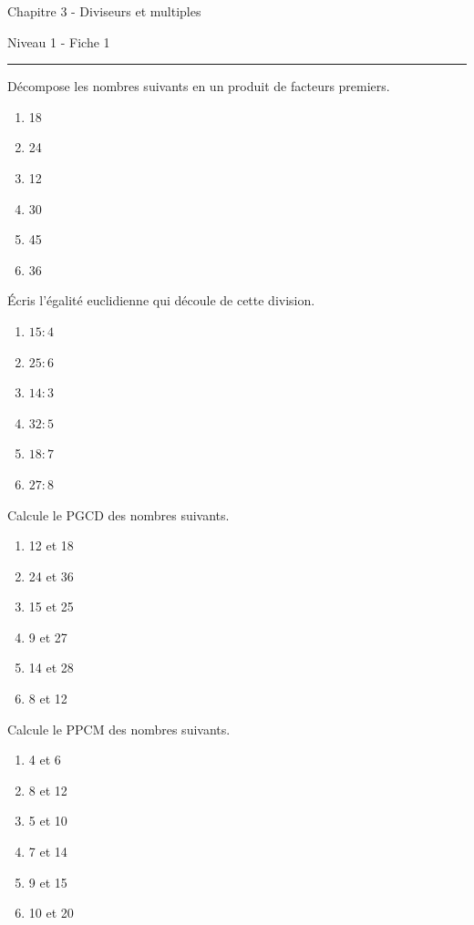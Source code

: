 \documentclass[12pt,parskip=half-, twoside=semi]{scrartcl}
\begin{document}
\begin{center}
  \bfseries
  \begin{Huge}
    Chapitre 3 - Diviseurs et multiples
  \end{Huge}
  \smallbreak
  \begin{large}
    Niveau 1  - Fiche 1
  \end{large}
  \smallbreak
  \rule[10pt]{.5\linewidth}{1 pt}
\end{center}

\begin{exercise}
  Décompose les nombres suivants en un produit de facteurs premiers.
  \begin{enumerate}[cols=3]
      \item 18
      \item 24
      \item 12
      \item 30
      \item 45
      \item 36
  \end{enumerate}
\end{exercise}

\begin{exercise}
  Écris l'égalité euclidienne qui découle de cette  division.
  \begin{enumerate}[cols=3]
    \item $15 : 4$
    \item $25 : 6$
    \item $14 : 3$
    \item $32 : 5$
    \item $18 : 7$
    \item $27 : 8$
  \end{enumerate}
\end{exercise}

\begin{exercise}
  Calcule le PGCD des nombres suivants.
\begin{enumerate}[cols=3]
    \item 12 et 18
    \item 24 et 36
    \item 15 et 25
    \item 9 et 27
    \item 14 et 28
    \item 8 et 12
 \end{enumerate}
\end{exercise}

\begin{exercise}
  Calcule le PPCM des nombres suivants.
  \begin{enumerate}[cols=3]
    \item 4 et 6
    \item 8 et 12
    \item 5 et 10
    \item 7 et 14
    \item 9 et 15
    \item 10 et 20
  \end{enumerate}
\end{exercise}
\end{document}
